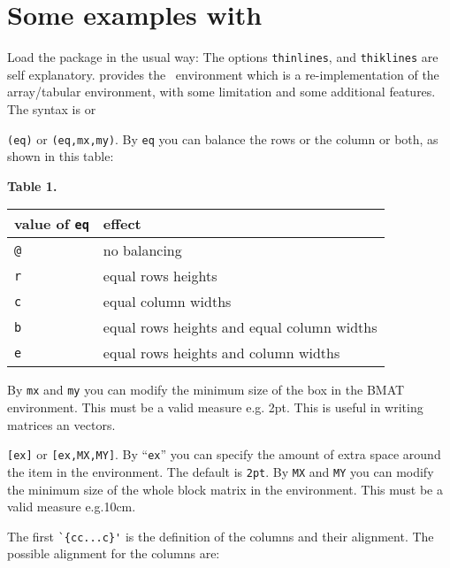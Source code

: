 \documentclass[twoside,a4paper]{article}
\begin{document}
\section{Some examples with }
Load the package in the usual way:
%
%
The options \texttt{thinlines}, and \texttt{thiklines} are self
explanatory.   provides the
~environment which is a re-implementation of the
array/tabular environment, with some limitation and some additional
features.  The syntax is
%
%
or 
%
%
\begin{dotlist}
  \item
  \verb|(eq)| or \verb|(eq,mx,my)|.  By \verb|eq| you can balance
  the rows or the column or both, as shown in this table:
  \begin{center}
    \par
    \textbf{Table 1.}\nobreak\\[1em]
    \begin{tabular}{|l|l|}
      \hline
      value of \verb|eq| & effect \\
      \hline
      \verb|@| & no balancing \\
      \verb|r| & equal rows heights \\
      \verb|c| & equal column widths  \\
      \verb|b| & equal rows heights and equal column widths \\
      \verb|e| & equal rows heights and column widths \\
      \hline
    \end{tabular}
    \par
  \end{center}
  By \verb|mx| and \verb|my| you can modify the minimum size of the
  box in the BMAT environment.  This must be a valid measure e.g.
  2pt.  This is useful in writing matrices an vectors.
  \item
  \verb|[ex]| or \verb|[ex,MX,MY]|.  By ``\verb|ex|'' you can specify
  the amount of extra space around the item in the 
  environment.  The default is \verb|2pt|.  By \verb|MX| and \verb|MY|
  you can modify the minimum size of the whole block matrix in the
   environment.  This must be a valid measure e.g.10cm.
  \item
  The first \verb|`{cc...c}'| is the definition of the columns and
  their alignment.  The possible alignment for the columns are:
  \begin{center}

\end{center}
\end{dotlist}
\end{document}
